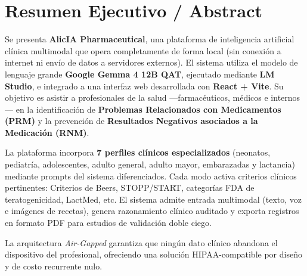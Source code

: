\documentclass[12pt,a4paper]{article}
\begin{document}
\tableofcontents
\newpage

\section{Resumen Ejecutivo / Abstract}

\begin{infobox}
  Se presenta \textbf{AlicIA Pharmaceutical}, una plataforma de inteligencia artificial clínica
  multimodal que opera completamente de forma local (sin conexión a internet ni envío de datos a
  servidores externos). El sistema utiliza el modelo de lenguaje grande \textbf{Google Gemma 4 12B QAT},
  ejecutado mediante \textbf{LM Studio}, e integrado a una interfaz web desarrollada con
  \textbf{React + Vite}. Su objetivo es asistir a profesionales de la salud ---farmacéuticos, médicos
  e internos--- en la identificación de \textbf{Problemas Relacionados con Medicamentos (PRM)} y la
  prevención de \textbf{Resultados Negativos asociados a la Medicación (RNM)}.

  La plataforma incorpora \textbf{7 perfiles clínicos especializados} (neonatos, pediatría,
  adolescentes, adulto general, adulto mayor, embarazadas y lactancia) mediante prompts del sistema
  diferenciados. Cada modo activa criterios clínicos pertinentes: Criterios de Beers, STOPP/START,
  categorías FDA de teratogenicidad, LactMed, etc. El sistema admite entrada multimodal (texto, voz
  e imágenes de recetas), genera razonamiento clínico auditado y exporta registros en formato PDF
  para estudios de validación doble ciego.

  La arquitectura \textit{Air-Gapped} garantiza que ningún dato clínico abandona el dispositivo del
  profesional, ofreciendo una solución HIPAA-compatible por diseño y de costo recurrente nulo.
\end{infobox}

\vspace{0.5cm}
\end{document}
